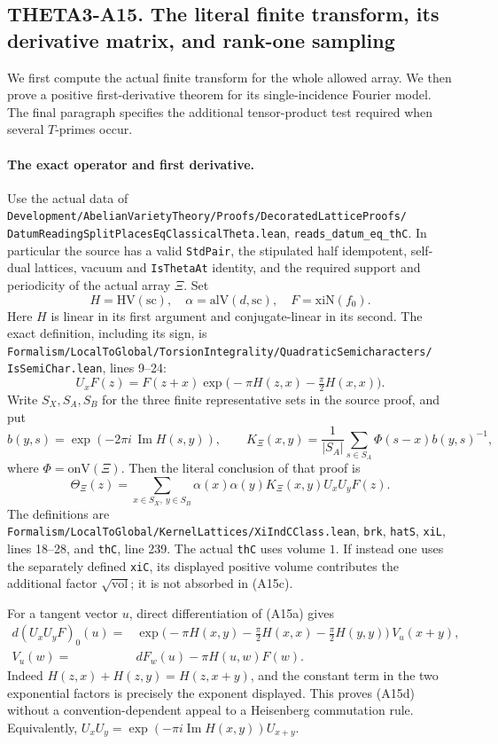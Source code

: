 \subsection{THETA3-A15. The literal finite transform, its derivative matrix, and rank-one sampling}
\label{A15}

We first compute the actual finite transform for the whole allowed
array.  We then prove a positive first-derivative theorem for its
single-incidence Fourier model.  The final paragraph specifies the
additional tensor-product test required when several $T$-primes occur.

\paragraph{The exact operator and first derivative.}
Use the actual data of
\texttt{Development/AbelianVarietyTheory/Proofs/DecoratedLatticeProofs/}
\texttt{DatumReadingSplitPlacesEqClassicalTheta.lean},
\texttt{reads\_datum\_eq\_thC}.  In particular the source has a valid
\texttt{StdPair}, the stipulated half idempotent, self-dual lattices,
vacuum and \texttt{IsThetaAt} identity, and the required support and
periodicity of the actual array $\Xi$.  Set
\[
 H=\mathrm{HV}(\mathrm{sc}),\quad
 \alpha=\mathrm{alV}(d,\mathrm{sc}),\quad
 F=\mathrm{xiN}(f_0).
\]
Here $H$ is linear in its first argument and conjugate-linear in its
second.  The exact definition, including its sign, is
\texttt{Formalism/LocalToGlobal/TorsionIntegrality/QuadraticSemicharacters/}
\texttt{IsSemiChar.lean}, lines 9--24:
\[
 U_xF(z)=F(z+x)
       \exp\bigl(-\pi H(z,x)-\tfrac\pi2H(x,x)\bigr).
 \tag{A15a}
\]
Write $S_X,S_A,S_B$ for the three finite representative sets in the
source proof, and put
\[
 b(y,s)=\exp(-2\pi i\,\operatorname{Im}H(s,y)),
 \qquad
 K_\Xi(x,y)=\frac1{|S_A|}\sum_{s\in S_A}
          \Phi(s-x)b(y,s)^{-1},
 \tag{A15b}
\]
where $\Phi=\mathrm{onV}(\Xi)$.  Then the literal conclusion of that
proof is
\[
 \Theta_\Xi(z)=
  \sum_{x\in S_X,\ y\in S_B}
      \alpha(x)\alpha(y)K_\Xi(x,y)U_xU_yF(z).
 \tag{A15c}
\]
The definitions are
\texttt{Formalism/LocalToGlobal/KernelLattices/XiIndCClass.lean},
\texttt{brk}, \texttt{hatS}, \texttt{xiL}, lines 18--28,
and \texttt{thC}, line 239.  The actual \texttt{thC} uses volume
$1$.  If instead one uses the separately defined \texttt{xiC},
its displayed positive volume contributes the additional factor
$\sqrt{\mathrm{vol}}$; it is not absorbed in (A15c).

For a tangent vector $u$, direct differentiation of (A15a) gives
\[
 \begin{split}
 d(U_xU_yF)_0(u)
  ={}&\exp\bigl(-\pi H(x,y)
              -\tfrac\pi2H(x,x)-\tfrac\pi2H(y,y)\bigr)\,V_u(x+y),\\
 V_u(w)={}&dF_w(u)-\pi H(u,w)F(w).
 \end{split}
 \tag{A15d}
\]
Indeed $H(z,x)+H(z,y)=H(z,x+y)$, and the constant term in
the two exponential factors is precisely the exponent displayed.
This proves (A15d) without a convention-dependent appeal to a
Heisenberg commutation rule.  Equivalently,
$U_xU_y=\exp(-\pi i\operatorname{Im}H(x,y))U_{x+y}$.

